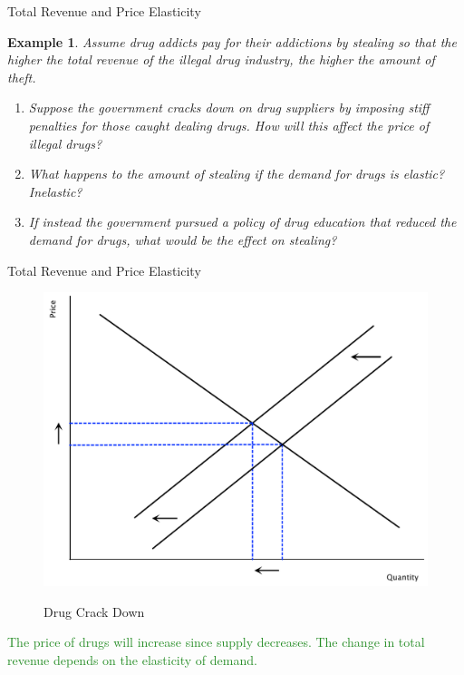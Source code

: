 \documentclass[xcolor={dvipsnames},pdf, hyperref={colorlinks=true, citecolor=ForestGreen, linkcolor=BlueViolet, urlcolor=Magenta}]{beamer}
\newtheorem{exmp}{Example}[section]
\newcommand{\ddp}[1]{{\textcolor{ForestGreen}{#1}}}
\begin{document}
\begin{frame}{Total Revenue and Price Elasticity}
		\begin{exmp} 
			
			Assume drug addicts pay for their addictions by stealing so that the higher the total revenue of the illegal drug industry, the higher the amount of theft.
			
			\begin{enumerate}
				\item Suppose the government cracks down on drug suppliers by imposing stiff penalties for those caught dealing drugs. How will this affect the price of illegal drugs?
				
				\item What happens to the amount of stealing if the demand for drugs is elastic? Inelastic?
			
				
				\item If instead the government pursued a policy of drug education that reduced the demand for drugs, what would be the effect on stealing? 
							
			\end{enumerate}
		\end{exmp}
	

\end{frame}

\begin{frame}[b]{Total Revenue and Price Elasticity}
		\begin{figure}[H]
			\centering
			\ddp{\includegraphics[scale=.25]{plot30.pdf}}
			\caption{Drug Crack Down}
		\end{figure}
		
		\ddp{The price of drugs will increase since supply decreases. The change in total revenue depends on the elasticity of demand.}
\end{frame}
\end{document}
